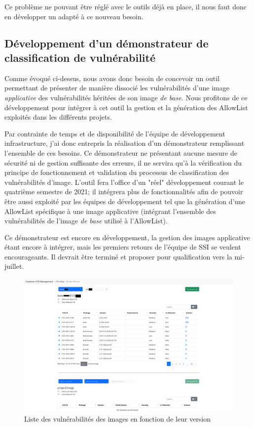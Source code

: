 Ce problème ne pouvant être réglé avec le outils déjà en place, il nous faut donc en développer un adapté à ce nouveau 
besoin.

\subsection{Développement d'un démonstrateur de classification de vulnérabilité}
Comme évoqué ci-dessus, nous avons donc besoin de concevoir un outil permettant de présenter de manière dissocié les
vulnérabilités d'une image \emph{applicative} des vulnérabilités héritées de son image \emph{de base}.
Nous profitons de ce développement pour intégrer à cet outil la gestion et la génération des AllowList exploités dans les
différents projets.

Par contrainte de temps et de disponibilité de l'équipe de développement infrastructure, j'ai donc entrepris la réalisation 
d'un démonstrateur remplissant l'ensemble de ces besoins. Ce démonstrateur ne présentant aucune mesure de sécurité ni de
gestion suffisante des erreurs, il ne servira qu'à la vérification du principe de fonctionnement et validation du 
processus de classification des vulnérabilités d'image.
\newline L'outil fera l'office d'un "réel" développement courant le quatrième semestre de 2021; il intégrera plus de 
fonctionnalités afin de pouvoir être aussi exploité par les équipes de développement tel que la génération d'une 
AllowList spécifique à une image applicative (intégrant l'ensemble des vulnérabilités de l'image \emph{de base} utilisé 
à l'AllowList). 

\newpage

Ce démonstrateur est encore en développement, la gestion des images applicative étant encore à intégrer, mais les 
premiers retours de l'équipe de \ac{SSI} se veulent encourageants.
\newline Il devrait être terminé et proposer pour qualification vers la mi-juillet.

\vspace{1cm}

\begin{figure}[h]
    \centering
    \includegraphics[width=0.9\linewidth]{resources/img/cont_mgnt_listing.png}
    \caption{Liste des vulnérabilités des images en fonction de leur version}
\end{figure}

